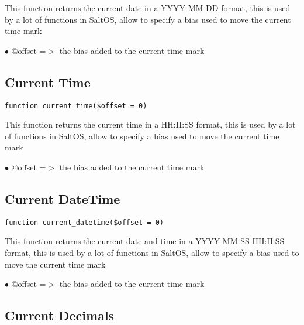 \documentclass[a4paper]{book}
\begin{document}
This function returns the current date in a YYYY-MM-DD format, this is used
by a lot of functions in SaltOS, allow to specify a bias used to move the
current time mark

\begin{compactitem}
\item[\color{myblue}$\bullet$] @offset =$>$ the bias added to the current time mark
\end{compactitem}

\hypertarget{toc75}{}
\subsection{Current Time}

\begin{lstlisting}
function current_time($offset = 0)
\end{lstlisting}

This function returns the current time in a HH:II:SS format, this is used
by a lot of functions in SaltOS, allow to specify a bias used to move the
current time mark

\begin{compactitem}
\item[\color{myblue}$\bullet$] @offset =$>$ the bias added to the current time mark
\end{compactitem}

\hypertarget{toc76}{}
\subsection{Current DateTime}

\begin{lstlisting}
function current_datetime($offset = 0)
\end{lstlisting}

This function returns the current date and time in a YYYY-MM-SS HH:II:SS format,
this is used by a lot of functions in SaltOS, allow to specify a bias used to
move the current time mark

\begin{compactitem}
\item[\color{myblue}$\bullet$] @offset =$>$ the bias added to the current time mark
\end{compactitem}

\hypertarget{toc77}{}
\subsection{Current Decimals}
\end{document}
